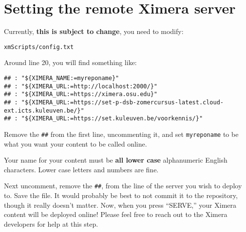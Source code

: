 \documentclass{ximera}
\begin{document}


\section{Setting the remote Ximera server}


Currently,  \textbf{this is subject to change}, you need to modify: 
\begin{verbatim}
xmScripts/config.txt
\end{verbatim}
Around line 20, you will find something like:
\begin{verbatim}
## : "${XIMERA_NAME:=myreponame}"
## : "${XIMERA_URL:=http://localhost:2000/}"
## : "${XIMERA_URL:=https://ximera.osu.edu}"
## : "${XIMERA_URL:=https://set-p-dsb-zomercursus-latest.cloud-ext.icts.kuleuven.be/}"
## : "${XIMERA_URL:=https://set.kuleuven.be/voorkennis/}"
\end{verbatim}
Remove the \verb!##! from the first line, uncommenting it, and set
\verb!myreponame! to be what
you want your content to be called online. 
\begin{warning}
    Your name for your content must be \textbf{all lower case} alphanumeric
    English characters. Lower case letters and numbers are fine.
\end{warning}
Next uncomment, remove the \verb!##!, from the line of the server you wish to
deploy to. Save the file. It would probably be best to not commit it to the
repository, though it really doesn't matter. Now, when you press ``SERVE,'' your Ximera content will be deployed online! Please feel free to reach out to the Ximera developers  for help at this step.
\end{document}
